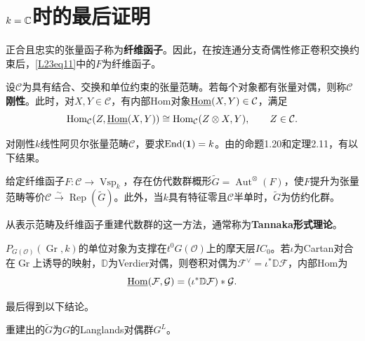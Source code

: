 \section{\texorpdfstring{$k=\mathbb{C}$}{k=C}时的最后证明}\label{L23S3}
正合且忠实的张量函子称为\textbf{纤维函子}。因此，在按连通分支奇偶性修正卷积交换约束后，\eqref{L23eq11}中的$F$为纤维函子。
\begin{definition*}
设$\mathcal C$为具有结合、交换和单位约束的张量范畴。若每个对象都有张量对偶，则称$\mathcal C$\textbf{刚性}。此时，对$X,Y\in\mathcal C$，有内部Hom对象$\underline{\operatorname{Hom}}(X,Y)\in\mathcal C$，满足
\[\operatorname{Hom}_{\mathcal C}(Z,\underline{\operatorname{Hom}}(X,Y))\cong\operatorname{Hom}_{\mathcal C}(Z\otimes X,Y),\qquad Z\in\mathcal C.\]
\end{definition*}
对刚性$k$线性阿贝尔张量范畴$\mathcal C$，要求$\operatorname{End}(\mathbf1)=k$。由的命题1.20和定理2.11，有以下结果。
\begin{theorem}\label{L23S3O1}
给定纤维函子$F:\mathcal C\to\operatorname{Vsp}_k$，存在仿代数群概形$\widetilde G=\operatorname{Aut}^{\otimes}(F)$，使$F$提升为张量范畴等价$\mathcal C\xrightarrow{\sim}\operatorname{Rep}(\widetilde G)$。此外，当$k$具有特征零且$\mathcal C$半单时，$\widetilde G$为仿约化群。
\end{theorem}
从表示范畴及纤维函子重建代数群的这一方法，通常称为\textbf{Tannaka形式理论}。
\begin{note}[L23S3O2]
$P_{G(\mathcal O)}(\operatorname{Gr},k)$的单位对象为支撑在$t^0G(\mathcal O)$上的摩天层$IC_0$。若$\iota$为Cartan对合在$\operatorname{Gr}$上诱导的映射，$\mathbb D$为Verdier对偶，则卷积对偶为$\mathcal F^\vee=\iota^*\mathbb D\mathcal F$，内部Hom为
\[\underline{\operatorname{Hom}}(\mathcal F,\mathcal G)=(\iota^*\mathbb D\mathcal F)*\mathcal G.\]
\end{note}
最后得到以下结论。
\begin{theorem}\label{L23S3O3}重建出的$\widetilde G$为$G$的Langlands对偶群$G^L$。\end{theorem}
